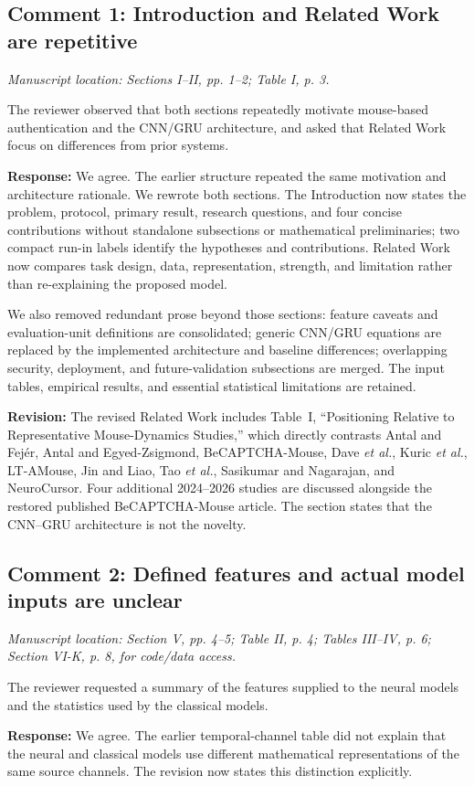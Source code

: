 \documentclass[11pt]{article}
\newcommand{\response}[1]{\par\noindent\textcolor{responseblue}{\textbf{Response:}} #1\par}
\newcommand{\change}[1]{\par\noindent\textcolor{responseblue}{\textbf{Revision:}} #1\par}
\newcommand{\location}[1]{\par\noindent\textit{Manuscript location: #1.}\par}
\begin{document}
\subsection*{Comment 1: Introduction and Related Work are repetitive}
\location{Sections I--II, pp. 1--2; Table I, p. 3}
The reviewer observed that both sections repeatedly motivate mouse-based
authentication and the CNN/GRU architecture, and asked that Related Work focus
on differences from prior systems.

\response{We agree. The earlier structure repeated the same motivation and
architecture rationale. We rewrote both sections. The Introduction now states
the problem, protocol, primary result, research questions, and four concise
contributions without standalone subsections or mathematical preliminaries;
two compact run-in labels identify the hypotheses and contributions. Related Work
now compares task design, data, representation, strength, and limitation rather
than re-explaining the proposed model.}

We also removed redundant prose beyond those sections: feature caveats and
evaluation-unit definitions are consolidated; generic CNN/GRU equations are
replaced by the implemented architecture and baseline differences; overlapping
security, deployment, and future-validation subsections are merged. The input
tables, empirical results, and essential statistical limitations are retained.

\change{The revised Related Work includes Table~I, ``Positioning Relative to
Representative Mouse-Dynamics Studies,'' which directly contrasts Antal and
Fej\'er, Antal and Egyed-Zsigmond, BeCAPTCHA-Mouse, Dave \textit{et al.},
Kuric \textit{et al.}, LT-AMouse, Jin and Liao, Tao \textit{et al.},
Sasikumar and Nagarajan, and NeuroCursor. Four additional 2024--2026 studies
are discussed alongside the restored published BeCAPTCHA-Mouse article.
The section states that the CNN--GRU architecture is not the novelty.}

\subsection*{Comment 2: Defined features and actual model inputs are unclear}
\location{Section V, pp. 4--5; Table II, p. 4; Tables III--IV, p. 6; Section VI-K, p. 8, for code/data access}
The reviewer requested a summary of the features supplied to the neural models
and the statistics used by the classical models.

\response{We agree. The earlier temporal-channel table did not explain that
the neural and classical models use different mathematical representations of
the same source channels. The revision now states this distinction explicitly.}
\end{document}
